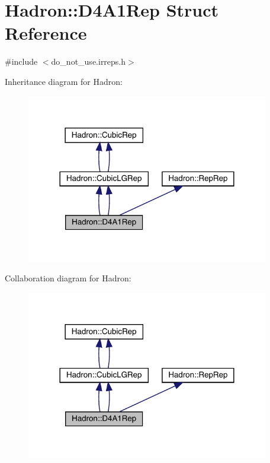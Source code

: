 \hypertarget{structHadron_1_1D4A1Rep}{}\section{Hadron\+:\+:D4\+A1\+Rep Struct Reference}
\label{structHadron_1_1D4A1Rep}


{\ttfamily \#include $<$do\+\_\+not\+\_\+use.\+irreps.\+h$>$}



Inheritance diagram for Hadron\+:\nopagebreak
\begin{figure}[H]
\begin{center}
\leavevmode
\includegraphics[width=300pt]{d6/d46/structHadron_1_1D4A1Rep__inherit__graph}
\end{center}
\end{figure}


Collaboration diagram for Hadron\+:\nopagebreak
\begin{figure}[H]
\begin{center}
\leavevmode
\includegraphics[width=300pt]{db/dee/structHadron_1_1D4A1Rep__coll__graph}
\end{center}
\end{figure}
